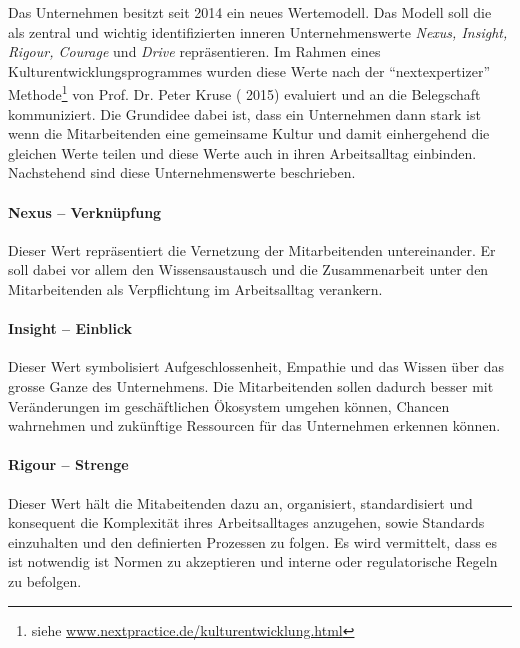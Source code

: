\begin{sloppypar}
Das Unternehmen besitzt seit 2014 ein neues Wertemodell. Das Modell soll die als zentral und wichtig identifizierten inneren Unternehmenswerte \textit{Nexus, Insight, Rigour, Courage} und \textit{Drive} repräsentieren. Im Rahmen eines Kulturentwicklungsprogrammes wurden diese Werte nach der "`nextexpertizer"' Methode\footnote{siehe \url{www.nextpractice.de/kulturentwicklung.html}} von Prof. Dr. Peter Kruse (\dag{} 2015) evaluiert und an die Belegschaft kommuniziert. Die Grundidee dabei ist, dass ein Unternehmen dann stark ist wenn die Mitarbeitenden eine gemeinsame Kultur und damit einhergehend die gleichen Werte teilen und diese Werte auch in ihren Arbeitsalltag einbinden. Nachstehend sind diese Unternehmenswerte beschrieben.
\end{sloppypar}

\paragraph*{Nexus -- Verknüpfung}\mbox{}

\begin{sloppypar}
Dieser Wert repräsentiert die Vernetzung der Mitarbeitenden untereinander. Er soll dabei vor allem den Wissensaustausch und die Zusammenarbeit unter den Mitarbeitenden als Verpflichtung im Arbeitsalltag verankern.
\end{sloppypar}

\paragraph*{Insight -- Einblick}\mbox{} 

\begin{sloppypar}
Dieser Wert symbolisiert Aufgeschlossenheit, Empathie und das Wissen über das grosse Ganze des Unternehmens. Die Mitarbeitenden sollen dadurch besser mit Veränderungen im geschäftlichen Ökosystem umgehen können, Chancen wahrnehmen und zukünftige Ressourcen für das Unternehmen erkennen können.
\end{sloppypar}

\paragraph*{Rigour -- Strenge}\mbox{} 

\begin{sloppypar}
Dieser Wert hält die Mitabeitenden dazu an, organisiert, standardisiert und konsequent die Komplexität ihres Arbeitsalltages anzugehen, sowie Standards einzuhalten und den definierten Prozessen zu folgen. Es wird vermittelt, dass es ist notwendig ist Normen zu akzeptieren und interne oder regulatorische Regeln zu befolgen.
\end{sloppypar}

